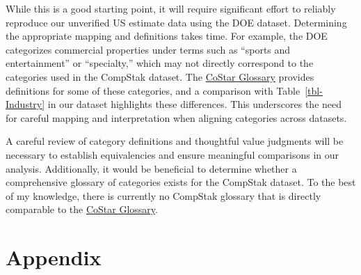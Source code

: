 \documentclass[
  12pt]{article}
\begin{document}
While this is a good starting point, it will require significant effort
to reliably reproduce our unverified US estimate data using the DOE
dataset. Determining the appropriate mapping and definitions takes time.
For example, the DOE categorizes commercial properties under terms such
as ``sports and entertainment'' or ``specialty,'' which may not directly
correspond to the categories used in the CompStak dataset. The
\href{https://www.costar.com/about/costar-glossary}{CoStar Glossary}
provides definitions for some of these categories, and a comparison with
Table~\ref{tbl-Industry} in our dataset highlights these differences.
This underscores the need for careful mapping and interpretation when
aligning categories across datasets.

A careful review of category definitions and thoughtful value judgments
will be necessary to establish equivalencies and ensure meaningful
comparisons in our analysis. Additionally, it would be beneficial to
determine whether a comprehensive glossary of categories exists for the
CompStak dataset. To the best of my knowledge, there is currently no
CompStak glossary that is directly comparable to the
\href{https://www.costar.com/about/costar-glossary}{CoStar Glossary}.

\section{Appendix}\label{appendix}
\end{document}
